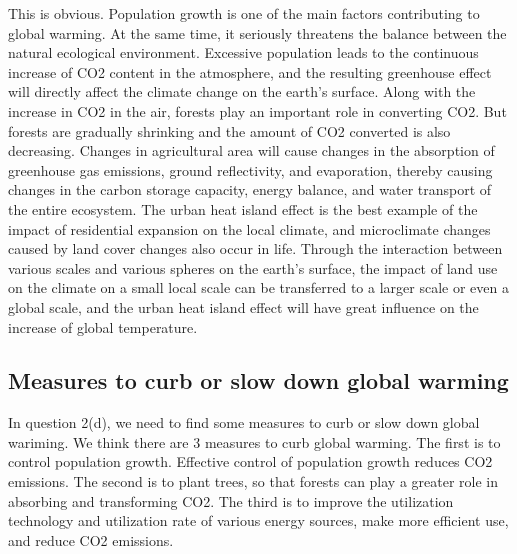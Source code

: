 \documentclass{apmcmthesis}
\begin{document}
  This is obvious. 
  Population growth is one of the main factors contributing to global warming. 
  At the same time, it seriously threatens the balance between the natural ecological environment. 
  Excessive population leads to the continuous increase of CO2 content in the atmosphere, and the resulting greenhouse effect will directly affect the climate change on the earth's surface. 
  Along with the increase in CO2 in the air, forests play an important role in converting CO2. 
  But forests are gradually shrinking and the amount of CO2 converted is also decreasing. 
  Changes in agricultural area will cause changes in the absorption of greenhouse gas emissions, ground reflectivity, and evaporation, 
  thereby causing changes in the carbon storage capacity, energy balance, and water transport of the entire ecosystem. 
  The urban heat island effect is the best example of the impact of residential expansion on the local climate, and microclimate changes caused by land cover changes also occur in life. 
  Through the interaction between various scales and various spheres on the earth's surface, the impact of land use on the climate on a small local scale can be transferred to a larger scale or even a global scale, 
  and the urban heat island effect will have great influence on the increase of global temperature.
  
  \subsection{Measures to curb or slow down global warming}
  In question 2(d), we need to find some measures to curb or slow down global wariming.
  We think there are 3 measures to curb global warming. The first is to control population growth. 
  Effective control of population growth reduces CO2 emissions. 
  The second is to plant trees, so that forests can play a greater role in absorbing and transforming CO2. 
  The third is to improve the utilization technology and utilization rate of various energy sources, make more efficient use, and reduce CO2 emissions.
  
  
  
  \newpage
\end{document}

